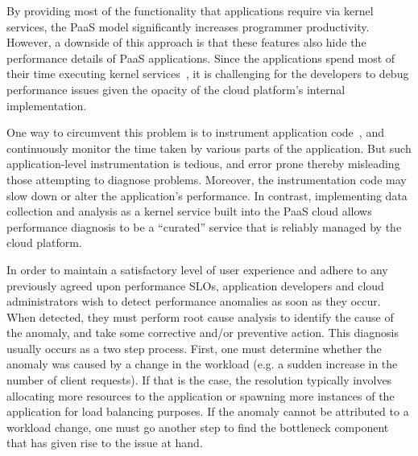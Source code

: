 By providing most of the functionality that applications require via
kernel services, the PaaS model
significantly increases programmer productivity.
However, a downside of this approach is that these features also hide
the performance details of PaaS applications. 
Since the applications spend most of their time executing kernel 
services~\cite{Jayathilaka:2015:RTS:2806777.2806842},
it is challenging for the developers to debug performance issues given the
opacity of the cloud platform's internal implementation. 

One way to circumvent this 
problem is to instrument application code~\cite{newrelic,datadog,dynatrace}, 
and continuously monitor the time taken by various
parts of the application. But such application-level instrumentation is tedious, and
error prone thereby misleading those attempting to diagnose problems.
Moreover, the instrumentation code may slow down or alter the application's
performance. 
In contrast, implementing data collection and analysis as a kernel service 
built into the PaaS cloud allows 
performance diagnosis to be a ``curated'' service that is 
reliably managed by the cloud platform.

In order to maintain a satisfactory level of user experience and adhere to any previously
agreed upon performance SLOs, application developers and cloud administrators wish
to detect performance anomalies as soon as they occur. When detected, they
must perform root cause analysis to identify the cause of the anomaly, and take some
corrective and/or preventive action. 
This diagnosis usually occurs as a two step process. First, one must determine
whether the anomaly was caused by a change in the workload (e.g. a sudden 
increase in the number of client requests). If that is the case,
the resolution typically involves allocating more resources to the application or spawning
more instances of the application for load balancing purposes. If the anomaly cannot be 
attributed to a workload change, one must go another step to find the bottleneck component
that has given rise to the issue at hand.


